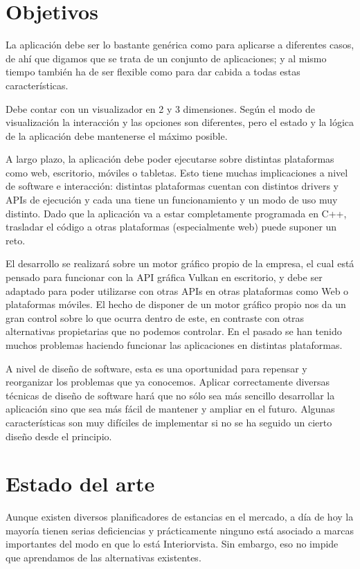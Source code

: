 \section{Objetivos}

La aplicación debe ser lo bastante genérica como para aplicarse a diferentes casos, de ahí que digamos que se trata de un conjunto de aplicaciones; y al mismo tiempo también ha de ser flexible como para dar cabida a todas estas características.

Debe contar con un visualizador en 2 y 3 dimensiones. Según el modo de visualización la interacción y las opciones son diferentes, pero el estado y la lógica de la aplicación debe mantenerse el máximo posible.

A largo plazo, la aplicación debe poder ejecutarse sobre distintas plataformas como web, escritorio, móviles o tabletas. Esto tiene muchas implicaciones a nivel de software e interacción: distintas plataformas cuentan con distintos drivers y APIs de ejecución y cada una tiene un funcionamiento y un modo de uso muy distinto. Dado que la aplicación va a estar completamente programada en C++, trasladar el código a otras plataformas (especialmente web) puede suponer un reto.

El desarrollo se realizará sobre un motor gráfico propio de la empresa, el cual está pensado para funcionar con la API gráfica Vulkan en escritorio, y debe ser adaptado para poder utilizarse con otras APIs en otras plataformas como Web o plataformas móviles. El hecho de disponer de un motor gráfico propio nos da un gran control sobre lo que ocurra dentro de este, en contraste con otras alternativas propietarias que no podemos controlar. En el pasado se han tenido muchos problemas haciendo funcionar las aplicaciones en distintas plataformas.

A nivel de diseño de software, esta es una oportunidad para repensar y reorganizar los problemas que ya conocemos. Aplicar correctamente diversas técnicas de diseño de software hará que no sólo sea más sencillo desarrollar la aplicación sino que sea más fácil de mantener y ampliar en el futuro. Algunas características son muy difíciles de implementar si no se ha seguido un cierto diseño desde el principio.

\section{Estado del arte}
Aunque existen diversos planificadores de estancias en el mercado, a día de hoy la mayoría tienen serias deficiencias y prácticamente ninguno está asociado a marcas importantes del modo en que lo está Interiorvista. Sin embargo, eso no impide que aprendamos de las alternativas existentes.

